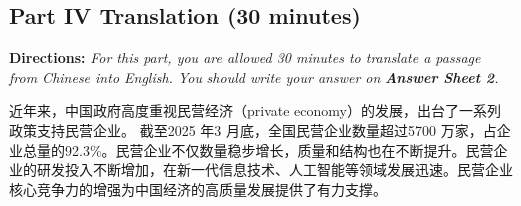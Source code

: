 \documentclass[UTF8,11pt]{ctexart}
\begin{document}
\subsection*{\textbf{Part IV Translation (30 minutes)}}


\textbf{Directions: }\textit{For this part, you are allowed 30 minutes to translate a passage from Chinese into English. You} \textit{should write your answer on }\textbf{\textit{Answer Sheet 2}}\textit{.}


近年来，中国政府高度重视民营经济（private economy）的发展，出台了一系列政策支持民营企业。 截至2025 年3 月底，全国民营企业数量超过5700 万家，占企业总量的92.3\%。民营企业不仅数量稳步增长，质量和结构也在不断提升。民营企业的研发投入不断增加，在新一代信息技术、人工智能等领域发展迅速。民营企业核心竞争力的增强为中国经济的高质量发展提供了有力支撑。
\end{document}
